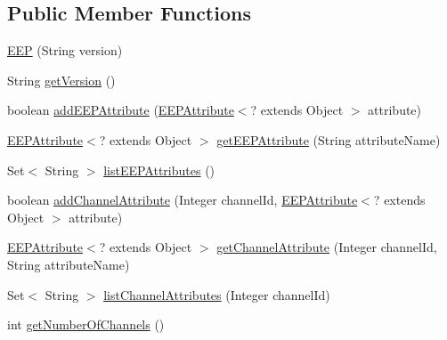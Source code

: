 \subsection*{Public Member Functions}
\begin{DoxyCompactItemize}
\item 
\hyperlink{classit_1_1polito_1_1elite_1_1enocean_1_1enj_1_1eep_1_1_e_e_p_af90cc83eda95bb42ebc188a8a96ee684}{E\+EP} (String version)
\item 
String \hyperlink{classit_1_1polito_1_1elite_1_1enocean_1_1enj_1_1eep_1_1_e_e_p_a02994c59d05bad9cd22418105ee6073c}{get\+Version} ()
\item 
boolean \hyperlink{classit_1_1polito_1_1elite_1_1enocean_1_1enj_1_1eep_1_1_e_e_p_ab0145135cf4a16084332a60fb6c9fbaf}{add\+E\+E\+P\+Attribute} (\hyperlink{classit_1_1polito_1_1elite_1_1enocean_1_1enj_1_1eep_1_1_e_e_p_attribute}{E\+E\+P\+Attribute}$<$? extends Object $>$ attribute)
\item 
\hyperlink{classit_1_1polito_1_1elite_1_1enocean_1_1enj_1_1eep_1_1_e_e_p_attribute}{E\+E\+P\+Attribute}$<$? extends Object $>$ \hyperlink{classit_1_1polito_1_1elite_1_1enocean_1_1enj_1_1eep_1_1_e_e_p_a8b011e52ec7631d2bc1b8594a1840781}{get\+E\+E\+P\+Attribute} (String attribute\+Name)
\item 
Set$<$ String $>$ \hyperlink{classit_1_1polito_1_1elite_1_1enocean_1_1enj_1_1eep_1_1_e_e_p_a466e8fb47d88c6d56c647b3dd0202b18}{list\+E\+E\+P\+Attributes} ()
\item 
boolean \hyperlink{classit_1_1polito_1_1elite_1_1enocean_1_1enj_1_1eep_1_1_e_e_p_a7d46294504d6741055558a19866fdcc4}{add\+Channel\+Attribute} (Integer channel\+Id, \hyperlink{classit_1_1polito_1_1elite_1_1enocean_1_1enj_1_1eep_1_1_e_e_p_attribute}{E\+E\+P\+Attribute}$<$? extends Object $>$ attribute)
\item 
\hyperlink{classit_1_1polito_1_1elite_1_1enocean_1_1enj_1_1eep_1_1_e_e_p_attribute}{E\+E\+P\+Attribute}$<$? extends Object $>$ \hyperlink{classit_1_1polito_1_1elite_1_1enocean_1_1enj_1_1eep_1_1_e_e_p_a5cfe75240487b93a55ef364071cb2bc4}{get\+Channel\+Attribute} (Integer channel\+Id, String attribute\+Name)
\item 
Set$<$ String $>$ \hyperlink{classit_1_1polito_1_1elite_1_1enocean_1_1enj_1_1eep_1_1_e_e_p_a8e1bc81c728b49915cbd061bdc1c60f2}{list\+Channel\+Attributes} (Integer channel\+Id)
\item 
int \hyperlink{classit_1_1polito_1_1elite_1_1enocean_1_1enj_1_1eep_1_1_e_e_p_a03ccc395ee002e8530bc46c7821160a2}{get\+Number\+Of\+Channels} ()
\item 

\end{DoxyCompactItemize}
